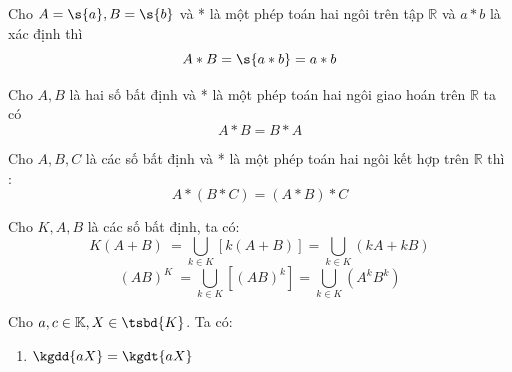 \begin{theorem}
	Cho $A = \s{a} , B = \s{b}$  và * là một phép toán hai ngôi trên tập $\mathbb{R}$ và $a*b$ là xác định thì $$A * B = \s{a*b} = a*b$$
\end{theorem}
\begin{theorem}
	Cho $A,B$ là hai số bất định và * là một phép toán hai ngôi giao hoán trên $\mathbb{R}$ ta có
	$$A*B  = B*A$$
\end{theorem}
\begin{theorem}
	Cho $A,B,C$ là các số bất định và * là một phép toán hai ngôi kết hợp trên $\mathbb{R}$ thì :
	\[A*(B*C) = (A*B)*C\]
\end{theorem}
\begin{theorem}
	Cho $K,A,B$ là các số bất định, ta có:
	\[K(A+B)\ = \bigcup_{k \in K} [k(A+B)] = \bigcup_{k \in K} (kA+kB)\]
	\[(AB)^K\ = \bigcup_{k \in K} \left[(AB)^k \right] = \bigcup_{k \in K} \left(A^kB^k\right)  \]
\end{theorem}
\begin{theorem}
Cho $a,c \in \mathbb{K}, X \in \tsbd{K}$. Ta có:
\begin{enumerate}
	\item $\kgdd{aX} = \kgdt{aX}$
\end{enumerate}
\end{theorem}
